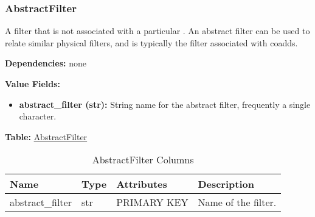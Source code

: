 \subsubsection{AbstractFilter}
\label{unit:AbstractFilter}

A filter that is not associated with a particular .
An abstract filter can be used to relate similar physical filters, and
is typically the filter associated with coadds.

\textbf{Dependencies:} none

\textbf{Value Fields:}
\begin{itemize}
  \item \textbf{abstract\_filter (str):}
      String name for the abstract filter, frequently a single
      character.
\end{itemize}

\textbf{Table:} \hyperref[tbl:AbstractFilter]{AbstractFilter}
\begin{table}[!htb]
  {\footnotesize
    \begin{tabular}{| l | l | l | p{} |}
      \hline
      \textbf{Name} & \textbf{Type} & \textbf{Attributes} & \textbf{Description} \\
      \hline
      abstract\_filter & str & PRIMARY KEY &
              Name of the filter.
          \\
      \hline
    \end{tabular}
  }
  \caption{AbstractFilter Columns}
  \label{tbl:AbstractFilter}
\end{table}
